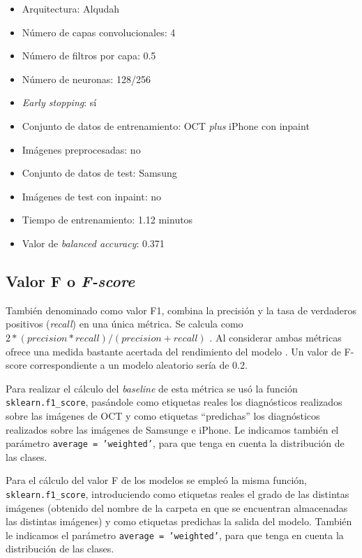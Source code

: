 \begin{itemize}
    \item Arquitectura: Alqudah
    \item Número de capas convolucionales: 4
    \item Número de filtros por capa: 0.5
    \item Número de neuronas: 128/256
    \item \textit{Early stopping}: sí
    \item Conjunto de datos de entrenamiento: OCT \textit{plus} iPhone con inpaint
    \item Imágenes preprocesadas: no
    \item Conjunto de datos de test: Samsung
    \item Imágenes de test con inpaint: no
    \item Tiempo de entrenamiento: 1.12 minutos
    \item Valor de \textit{balanced accuracy}: 0.371
\end{itemize}

\subsection{Valor F o \textit{F-score}}

También denominado como valor F1, combina la precisión y la tasa de verdaderos positivos (\textit{recall}) en una única métrica. Se calcula como $2*(precision*recall)/(precision+recall)$ \cite{sklearn:fscore}. Al considerar ambas métricas ofrece una medida bastante acertada del rendimiento del modelo \cite{metrics:inbal}. Un valor de F-score correspondiente a un modelo aleatorio sería de 0.2.

Para realizar el cálculo del \textit{baseline} de esta métrica se usó la función \texttt{sklearn.f1\_score}, pasándole como etiquetas reales los diagnósticos realizados sobre las imágenes de OCT y como etiquetas ``predichas'' los diagnósticos realizados sobre las imágenes de Samsunge e iPhone. Le indicamos también el parámetro \texttt{average = 'weighted'}, para que tenga en cuenta la distribución de las clases.

Para el cálculo del valor F de los modelos se empleó la misma función, \texttt{sklearn.f1\_score}, introduciendo como etiquetas reales el grado de las distintas imágenes (obtenido del nombre de la carpeta en que se encuentran almacenadas las distintas imágenes) y como etiquetas predichas la salida del modelo. También le indicamos el parámetro \texttt{average = 'weighted'}, para que tenga en cuenta la distribución de las clases.

